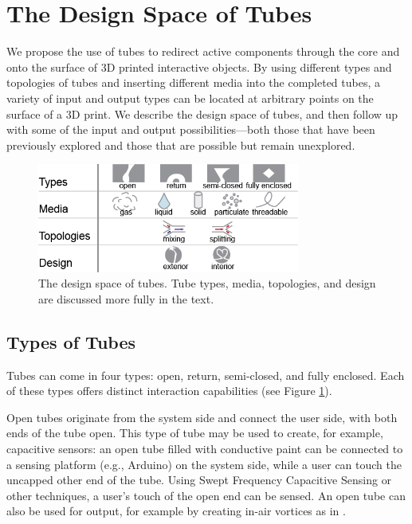 \section{The Design Space of Tubes}

We propose the use of tubes to redirect active components through the core and onto the surface of 3D printed interactive objects.  By using different types and topologies of tubes and inserting different media into the completed tubes, a variety of input and output types  can be located at arbitrary points on the surface of a 3D print.  We describe the design space of tubes, and then follow up with some of the input and output possibilities---both those that have been previously explored and those that are possible but remain unexplored.

\begin{figure}[h]
\centering
    \includegraphics[width=3.4in]{figures/tubespace.png}
\caption{The design space of tubes.  Tube types, media, topologies, and design are discussed more fully in the text.}
\label{fig:tubespace}
\end{figure}

\subsection{Types of Tubes}

Tubes can come in four types: open, return, semi-closed, and fully enclosed.  Each of these types offers distinct interaction capabilities (see Figure \ref{fig:tubespace}).

Open tubes originate from the system side and connect the user side, with both ends of the tube open.  This type of tube may be used to create, for example, capacitive sensors: an open tube filled with conductive paint can be connected to a sensing platform (e.g., Arduino) on the system side, while a user can touch the uncapped other end of the tube.  Using Swept Frequency Capacitive Sensing \cite{Sato-touche} or other techniques, a user's touch of the open end can be sensed.  An open tube can also be used for output, for example by creating in-air vortices as in \cite{Sodhi-aireal}.

